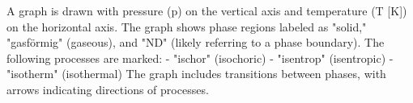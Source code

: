 A graph is drawn with pressure (p) on the vertical axis and temperature (T [K]) on the horizontal axis. The graph shows phase regions labeled as "solid," "gasförmig" (gaseous), and "ND" (likely referring to a phase boundary). The following processes are marked:  
- "ischor" (isochoric)  
- "isentrop" (isentropic)  
- "isotherm" (isothermal)  
The graph includes transitions between phases, with arrows indicating directions of processes.